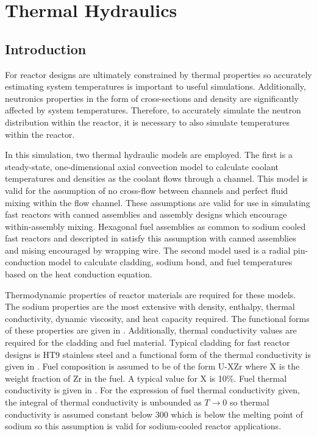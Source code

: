 \chapter{Thermal Hydraulics}
\label{ch:thermalHydraulics}

\section{Introduction}
  For reactor designs are ultimately constrained by thermal properties so
  accurately estimating system temperatures is important to useful simulations.
  Additionally, neutronics properties in the form of cross-sections 
  and density are significantly affected by system temperatures.
  Therefore, to accurately simulate the neutron distribution within the reactor,
  it is necessary to also simulate temperatures within the reactor.

  In this simulation, two thermal hydraulic models are
  employed. The first is a steady-state, one-dimensional axial convection model
  to calculate coolant temperatures and densities as the coolant flows through
  a channel. This
  model is valid for the assumption of no cross-flow between channels and 
  perfect fluid mixing within the flow channel. These assumptions are valid for
  use in simulating fast reactors with canned assemblies and assembly designs
  which encourage within-assembly mixing. Hexagonal fuel assemblies as common to
  sodium cooled fast reactors and descripted in 
  satisfy this assumption with canned assemblies and mising encouraged by
  wrapping wire. The second model used is
  a radial pin-conduction model to calculate cladding, sodium bond, and fuel 
  temperatures based on the heat conduction equation.

  Thermodynamic properties of reactor materials are required for these models.
  The sodium properties are the most extensive with density, enthalpy, 
  thermal conductivity, dynamic viscosity, and heat capacity required. The 
  functional forms of these properties are given in 
  \cite{sodiumProp}. Additionally, thermal conductivity values are required for 
  the cladding and fuel material. Typical cladding for fast reactor designs is 
  HT9 stainless steel and a functional form of the thermal conductivity is given
  in \cite{ht9Prop}. Fuel composition is assumed to be of the form U-XZr where
  X is the weight fraction of Zr in the fuel. A typical value for X is 10\%.
  Fuel thermal conductivity is given in \cite{fuelProp}. For the expression of
  fuel thermal conductivity given, the integral of thermal conductivity 
  is unbounded as $T \rightarrow 0$ so thermal conductivity is assumed
  constant below 300  which is below the melting point of sodium so 
  this assumption is valid for sodium-cooled reactor applications.

